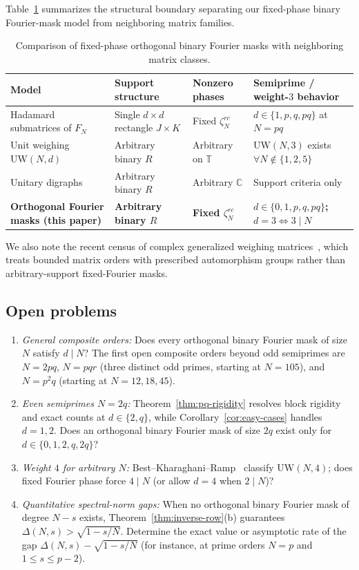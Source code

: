 \documentclass[11pt,reqno]{amsart}
\numberwithin{equation}{section}
\theoremstyle{definition}
\theoremstyle{remark}
\newcommand{\C}{\mathbb{C}}
\begin{document}
Table~\ref{tab:compare} summarizes the structural boundary separating our fixed-phase binary Fourier-mask model from neighboring matrix families.

\begin{table}[ht]
\centering
\caption{Comparison of fixed-phase orthogonal binary Fourier masks with neighboring matrix classes.}
\label{tab:compare}
\begin{tabular}{llll}
\toprule
Model & Support structure & Nonzero phases & Semiprime / weight-$3$ behavior \\
\midrule
Hadamard submatrices of $F_N$~\cite{BGH19,HW21,MK17} & Single $d\times d$ rectangle $J\times K$ & Fixed $\zeta_N^{rc}$ & $d\in\{1,p,q,pq\}$ at $N=pq$ \\
Unit weighing $\mathrm{UW}(N,d)$~\cite{BKR13} & Arbitrary binary $R$ & Arbitrary on $\mathbb{T}$ & $\mathrm{UW}(N,3)$ exists $\forall N\notin\{1,2,5\}$ \\
Unitary digraphs~\cite{Sev03} & Arbitrary binary $R$ & Arbitrary $\C$ & Support criteria only \\
\textbf{Orthogonal Fourier masks (this paper)} & \textbf{Arbitrary binary $R$} & \textbf{Fixed $\zeta_N^{rc}$} & \textbf{$d\in\{0,1,p,q,pq\}$; $d=3\Leftrightarrow 3\mid N$} \\
\bottomrule
\end{tabular}
\end{table}

We also note the recent census of complex generalized weighing matrices~\cite{EOS26}, which treats bounded matrix orders with prescribed automorphism groups rather than arbitrary-support fixed-Fourier masks.

\subsection{Open problems}
\begin{enumerate}[label=(\arabic*),leftmargin=2em]
\item \emph{General composite orders:} Does every orthogonal binary Fourier mask of size $N$ satisfy $d\mid N$? The first open composite orders beyond odd semiprimes are $N=2pq$, $N=pqr$ (three distinct odd primes, starting at $N=105$), and $N=p^2 q$ (starting at $N=12, 18, 45$).
\item \emph{Even semiprimes $N=2q$:} Theorem~\ref{thm:pq-rigidity} resolves block rigidity and exact counts at $d\in\{2,q\}$, while Corollary~\ref{cor:easy-cases} handles $d=1,2$. Does an orthogonal binary Fourier mask of size $2q$ exist only for $d\in\{0,1,2,q,2q\}$?
\item \emph{Weight $4$ for arbitrary $N$:} Best--Kharaghani--Ramp~\cite{BKR13} classify $\mathrm{UW}(N,4)$; does fixed Fourier phase force $4\mid N$ (or allow $d=4$ when $2\mid N$)?
\item \emph{Quantitative spectral-norm gaps:} When no orthogonal binary Fourier mask of degree $N-s$ exists, Theorem~\ref{thm:inverse-row}(b) guarantees $\Delta(N,s)>\sqrt{1-s/N}$. Determine the exact value or asymptotic rate of the gap $\Delta(N,s)-\sqrt{1-s/N}$ (for instance, at prime orders $N=p$ and $1\le s\le p-2$).
\end{enumerate}
\end{document}

